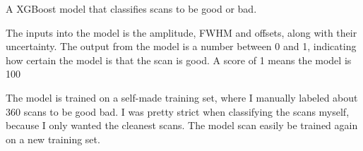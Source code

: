 A XGBoost model that classifies scans to be good or bad.

The inputs into the model is the amplitude, FWHM and offsets, along with their uncertainty.
The output from the model is a number between 0 and 1, indicating how certain the model is that the scan is good.
A score of 1 means the model is 100%

The model is trained on a self-made training set, where I manually labeled about 360 scans to be good bad.
I was pretty strict when classifying the scans myself, because I only wanted the cleanest scans. 
The model scan easily be trained again on a new training set.

